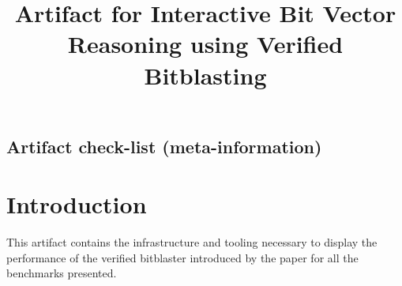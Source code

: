 \documentclass[acmlarge, nonacm]{acmart}
\begin{document}



\appendix
\title[Artifact]{Artifact for Interactive Bit Vector Reasoning using Verified Bitblasting}

\maketitle



\subsection{Artifact check-list (meta-information)}


\section{Introduction}

This artifact contains the infrastructure and tooling necessary to display the performance of the 
verified bitblaster introduced by the paper for all the benchmarks presented.
\end{document}
